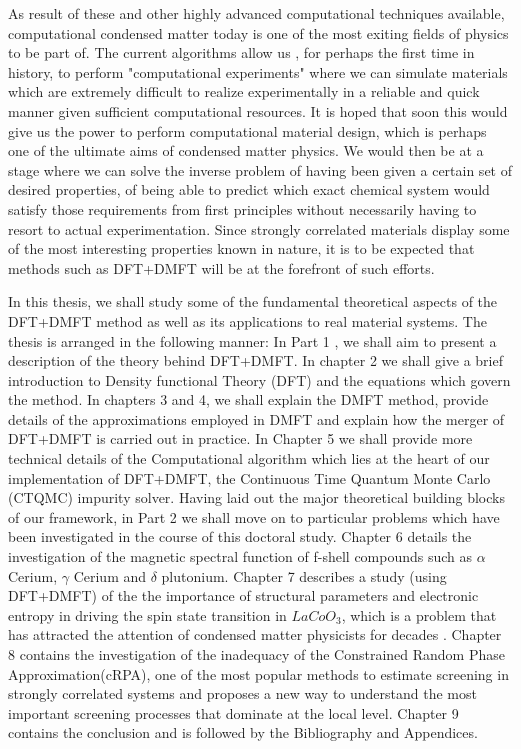 \documentclass[10pt]{ruthesis}
\begin{document}
As result of these and other highly advanced computational techniques available, computational condensed matter today is one of the most exiting fields of physics to be part of. The current algorithms allow us , for perhaps the first time in history, to perform "computational experiments" where we can simulate materials which are extremely difficult to realize experimentally in a reliable and quick manner given sufficient computational resources. It is hoped that soon this would give us the power to perform computational material design, which is perhaps one of the ultimate aims of condensed matter physics. We would then be at a stage where we can solve the inverse problem of having been given a certain set of desired properties, of being able to predict which exact chemical system would satisfy those requirements from first principles without necessarily having to resort to actual experimentation. Since strongly correlated materials display some of the most interesting properties known in nature, it is to be expected that methods such as DFT+DMFT will be at the forefront of such efforts. 

In this thesis, we shall study some of the fundamental theoretical aspects of the DFT+DMFT method as well as its applications to real material systems. The thesis is arranged in the following manner: In Part 1 , we shall aim to present a description of the theory behind DFT+DMFT. In chapter 2 we shall give a brief introduction to Density functional Theory (DFT) and the equations which govern the method. In chapters 3 and 4, we shall explain the DMFT method, provide details of the approximations employed in DMFT  and explain how the merger of DFT+DMFT is carried out in practice. In Chapter 5 we shall provide more technical details of the Computational algorithm which lies at the heart of our implementation of DFT+DMFT, the Continuous Time Quantum Monte Carlo (CTQMC) impurity solver. Having laid out the major theoretical building blocks of our framework, in Part 2 we shall move on to particular problems which have been investigated in the course of this doctoral study. Chapter 6 details the investigation of the magnetic spectral function of f-shell compounds such as $\alpha$ Cerium, $\gamma$ Cerium and $\delta$ plutonium. Chapter 7 describes a study (using DFT+DMFT) of the the importance of structural parameters and electronic entropy in  driving the spin state transition in $LaCoO_3$, which is a problem that has attracted the attention of condensed matter physicists for decades . Chapter 8 contains the investigation of the inadequacy of the Constrained Random Phase Approximation(cRPA), one of the most popular methods to estimate screening in strongly correlated systems and proposes a new way to understand the most important screening processes that dominate at the local level. Chapter 9 contains the conclusion and is followed by the Bibliography and Appendices.
\end{document}
